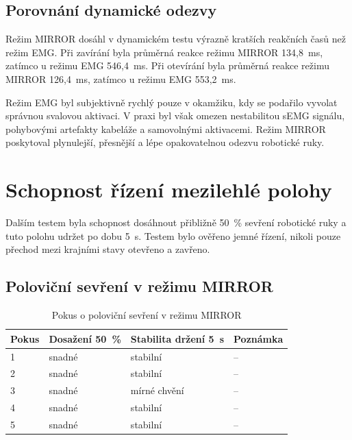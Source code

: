 \subsection{Porovnání dynamické odezvy}
\label{subsec:porovnani-dynamiky}

Režim MIRROR dosáhl v dynamickém testu výrazně kratších reakčních časů než režim EMG\@. Při zavírání byla průměrná reakce režimu MIRROR 134{,}8~ms, zatímco u režimu EMG 546{,}4~ms. Při otevírání byla průměrná reakce režimu MIRROR 126{,}4~ms, zatímco u režimu EMG 553{,}2~ms.

Režim EMG byl subjektivně rychlý pouze v okamžiku, kdy se podařilo vyvolat správnou svalovou aktivaci. V praxi byl však omezen nestabilitou sEMG signálu, pohybovými artefakty kabeláže a samovolnými aktivacemi. Režim MIRROR poskytoval plynulejší, přesnější a lépe opakovatelnou odezvu robotické ruky.

\section{Schopnost řízení mezilehlé polohy}
\label{sec:mezilehla-poloha}

Dalším testem byla schopnost dosáhnout přibližně 50~\% sevření robotické ruky a tuto polohu udržet po dobu 5~s. Testem bylo ověřeno jemné řízení, nikoli pouze přechod mezi krajními stavy otevřeno a zavřeno.

\subsection{Poloviční sevření v režimu MIRROR}
\label{subsec:polovicni-mirror}

\begin{table}[H]
\centering
\caption{Pokus o poloviční sevření v režimu MIRROR}
\label{tab:mirror-polovicni-sevreni}
\setlength{\tabcolsep}{2pt}
\begin{tabular}{|p{}|p{}|p{}|p{}|}
\hline
\textbf{Pokus} & \textbf{Dosažení 50~\%} & \textbf{Stabilita držení 5~s} & \textbf{Poznámka} \\
\hline
1 & snadné & stabilní & -- \\
\hline
2 & snadné & stabilní & -- \\
\hline
3 & snadné & mírné chvění & -- \\
\hline
4 & snadné & stabilní & -- \\
\hline
5 & snadné & stabilní & -- \\
\hline
\end{tabular}
\end{table}

